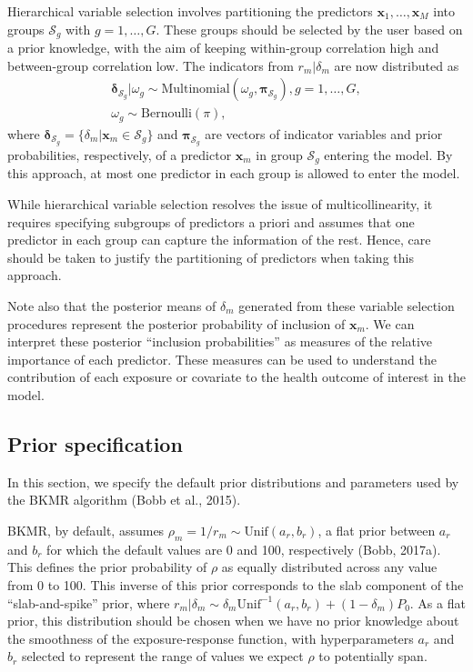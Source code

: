 \documentclass[12pt, twoside]{amherstthesis}
\begin{document}
Hierarchical variable selection involves partitioning the predictors \(\textbf{x}_1, \dots, \textbf{x}_M\) into groups \(\mathcal{S}_g\) with \(g = 1,\dots,G\). These groups should be selected by the user based on a prior knowledge, with the aim of keeping within-group correlation high and between-group correlation low. The indicators from \(r_m|\delta_m\) are now distributed as
\begin{gather*}
\boldsymbol\delta_{\mathcal{S}_g} | \omega_g \sim 
\text{Multinomial}(\omega_g, \boldsymbol\pi_{\mathcal{S}_g}), g=1,\dots,G,\\
\omega_g \sim\text{Bernoulli}(\pi),
\end{gather*}
\noindent where \(\boldsymbol\delta_{\mathcal{S}_g}=\{\delta_m|\textbf{x}_m \in{\mathcal{S}_g}\}\) and \(\boldsymbol\pi_{\mathcal{S}_g}\) are vectors of indicator variables and prior probabilities, respectively, of a predictor \(\textbf{x}_m\) in group \(\mathcal{S}_g\) entering the model. By this approach, at most one predictor in each group is allowed to enter the model.

While hierarchical variable selection resolves the issue of multicollinearity, it requires specifying subgroups of predictors a priori and assumes that one predictor in each group can capture the information of the rest. Hence, care should be taken to justify the partitioning of predictors when taking this approach.

Note also that the posterior means of \(\delta_m\) generated from these variable selection procedures represent the posterior probability of inclusion of \(\textbf{x}_m\). We can interpret these posterior ``inclusion probabilities'' as measures of the relative importance of each predictor. These measures can be used to understand the contribution of each exposure or covariate to the health outcome of interest in the model.

\hypertarget{prior-specification}{%
\subsection{Prior specification}\label{prior-specification}}

In this section, we specify the default prior distributions and parameters used by the BKMR algorithm (Bobb et al., 2015).

BKMR, by default, assumes \(\rho_m=1/r_m \sim \text{Unif}(a_r,b_r)\), a flat prior between \(a_r\) and \(b_r\) for which the default values are 0 and 100, respectively (Bobb, 2017a). This defines the prior probability of \(\rho\) as equally distributed across any value from 0 to 100. This inverse of this prior corresponds to the slab component of the ``slab-and-spike'' prior, where \(r_m|\delta_m \sim \delta_m\text{Unif}^{-1}(a_r, b_r) + (1-\delta_m)P_0\). As a flat prior, this distribution should be chosen when we have no prior knowledge about the smoothness of the exposure-response function, with hyperparameters \(a_r\) and \(b_r\) selected to represent the range of values we expect \(\rho\) to potentially span.
\end{document}
